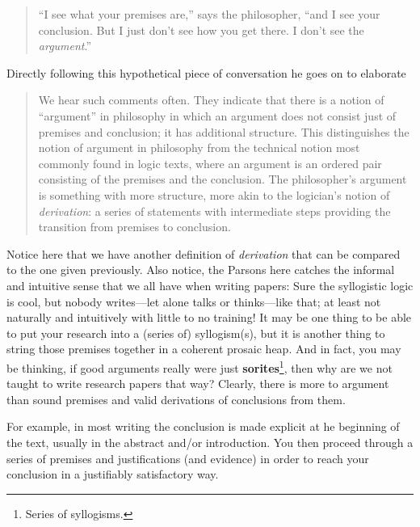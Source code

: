 \documentclass{article}
\begin{document}
\begin{quote}
``I see what your premises are,'' says the philosopher, ``and I see your conclusion.  But I just don't see how you get there.  I don't see the \textsl{argument}.'' 
\end{quote}

Directly following this hypothetical piece of conversation he goes on to elaborate

\begin{quote}
We hear such comments often.  They indicate that there is a notion of ``argument'' in philosophy in which an argument does not consist just of premises and conclusion; it has additional structure.  This distinguishes the notion of argument in philosophy from the technical notion most commonly found in logic texts, where an argument is an ordered pair consisting of the premises and the conclusion.  The philosopher's argument is something with more structure, more akin to the logician's notion of \textsl{derivation}: a series of statements with intermediate steps providing the transition from premises to conclusion.  
\end{quote}

Notice here that we have another definition of \textsl{derivation} that can be compared to the one given previously. Also notice, the Parsons here catches the informal and intuitive sense that we all have when writing papers: Sure the syllogistic logic is cool, but nobody writes---let alone talks or thinks---like that; at least not naturally and intuitively with little to no training! It may be one thing to be able to put your research into a (series of) syllogism(s), but it is another thing to string those premises together in a coherent prosaic heap. And in fact, you may be thinking, if good arguments really were just \textbf{sorites}\footnote{Series of syllogisms.}, then why are we not taught to write research papers that way? Clearly, there is more to argument than sound premises and valid derivations of conclusions from them.

\begin{remark}
For example, in most writing the conclusion is made explicit at he beginning of the text, usually in the abstract and/or introduction. You then proceed through a series of premises and justifications (and evidence) in order to reach your conclusion in a justifiably satisfactory way.
\end{remark}
\end{document}
